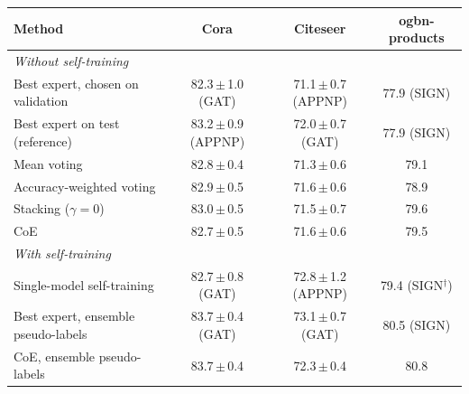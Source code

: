 \begin{tabular}{l ccc}
\toprule
Method & Cora & Citeseer & ogbn-products \\
\midrule
\multicolumn{4}{l}{\textit{Without self-training}} \\
Best expert, chosen on validation & 82.3\,$\pm$\,1.0 (GAT) & 71.1\,$\pm$\,0.7 (APPNP) & 77.9 (SIGN) \\
Best expert on test (reference) & 83.2\,$\pm$\,0.9 (APPNP) & 72.0\,$\pm$\,0.7 (GAT) & 77.9 (SIGN) \\
Mean voting & 82.8\,$\pm$\,0.4 & 71.3\,$\pm$\,0.6 & 79.1 \\
Accuracy-weighted voting & 82.9\,$\pm$\,0.5 & 71.6\,$\pm$\,0.6 & 78.9 \\
Stacking ($\gamma=0$) & 83.0\,$\pm$\,0.5 & 71.5\,$\pm$\,0.7 & 79.6 \\
CoE & 82.7\,$\pm$\,0.5 & 71.6\,$\pm$\,0.6 & 79.5 \\
\midrule\multicolumn{4}{l}{\textit{With self-training}} \\
Single-model self-training & 82.7\,$\pm$\,0.8 (GAT) & 72.8\,$\pm$\,1.2 (APPNP) & 79.4 (SIGN$^\dagger$) \\
Best expert, ensemble pseudo-labels & 83.7\,$\pm$\,0.4 (GAT) & 73.1\,$\pm$\,0.7 (GAT) & 80.5 (SIGN) \\
CoE, ensemble pseudo-labels & 83.7\,$\pm$\,0.4 & 72.3\,$\pm$\,0.4 & 80.8 \\
\bottomrule
\end{tabular}

